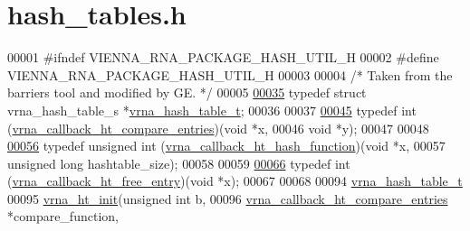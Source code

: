 \hypertarget{hash__tables_8h_source}{}\section{hash\+\_\+tables.\+h}
\label{hash__tables_8h_source}

\begin{DoxyCode}
00001 \textcolor{preprocessor}{#ifndef VIENNA\_RNA\_PACKAGE\_HASH\_UTIL\_H}
00002 \textcolor{preprocessor}{#define VIENNA\_RNA\_PACKAGE\_HASH\_UTIL\_H}
00003 
00004 \textcolor{comment}{/* Taken from the barriers tool and modified by GE. */}
00005 
\hyperlink{group__hash__table__utils_gabc7c6f41b718c8e23929e528891a89c4}{00035} \textcolor{keyword}{typedef} \textcolor{keyword}{struct }vrna\_hash\_table\_s *\hyperlink{group__hash__table__utils_gabc7c6f41b718c8e23929e528891a89c4}{vrna\_hash\_table\_t};
00036 
00037 
\hyperlink{group__hash__table__utils_gace4adf608f9dc246f66f6264d30c0f8d}{00045} \textcolor{keyword}{typedef} int (\hyperlink{group__hash__table__utils_gace4adf608f9dc246f66f6264d30c0f8d}{vrna\_callback\_ht\_compare\_entries})(\textcolor{keywordtype}{void} *x,
00046                                                \textcolor{keywordtype}{void} *y);
00047 
00048 
\hyperlink{group__hash__table__utils_ga8533dc0cb44035d5fdb05e3c28922d2b}{00056} \textcolor{keyword}{typedef} \textcolor{keywordtype}{unsigned} int (\hyperlink{group__hash__table__utils_ga8533dc0cb44035d5fdb05e3c28922d2b}{vrna\_callback\_ht\_hash\_function})(\textcolor{keywordtype}{void}          *x,
00057                                                       \textcolor{keywordtype}{unsigned} \textcolor{keywordtype}{long} hashtable\_size);
00058 
00059 
\hyperlink{group__hash__table__utils_ga3ff18cc70db8bb6f8cfee2c2b1542afc}{00066} \textcolor{keyword}{typedef} int (\hyperlink{group__hash__table__utils_ga3ff18cc70db8bb6f8cfee2c2b1542afc}{vrna\_callback\_ht\_free\_entry})(\textcolor{keywordtype}{void} *x);
00067 
00068 
00094 \hyperlink{group__hash__table__utils_gabc7c6f41b718c8e23929e528891a89c4}{vrna\_hash\_table\_t}
00095 \hyperlink{group__hash__table__utils_ga37d1c7e13087a2b7c1b87fda34577c29}{vrna\_ht\_init}(\textcolor{keywordtype}{unsigned} \textcolor{keywordtype}{int}                     b,
00096              \hyperlink{group__hash__table__utils_gace4adf608f9dc246f66f6264d30c0f8d}{vrna\_callback\_ht\_compare\_entries} *compare\_function,

\end{DoxyCode}
